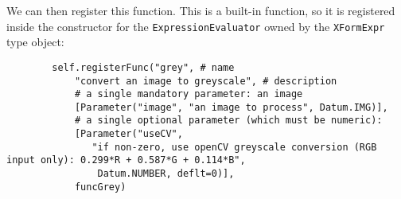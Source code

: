 We can then register this function. This is a built-in function, so it is registered inside the constructor for
the \texttt{ExpressionEvaluator} owned by the \texttt{XFormExpr} type object:

\begin{lstlisting}
        self.registerFunc("grey", # name 
            "convert an image to greyscale", # description
            # a single mandatory parameter: an image
            [Parameter("image", "an image to process", Datum.IMG)],
            # a single optional parameter (which must be numeric):
            [Parameter("useCV",
               "if non-zero, use openCV greyscale conversion (RGB input only): 0.299*R + 0.587*G + 0.114*B",
                Datum.NUMBER, deflt=0)],
            funcGrey)
\end{lstlisting}

